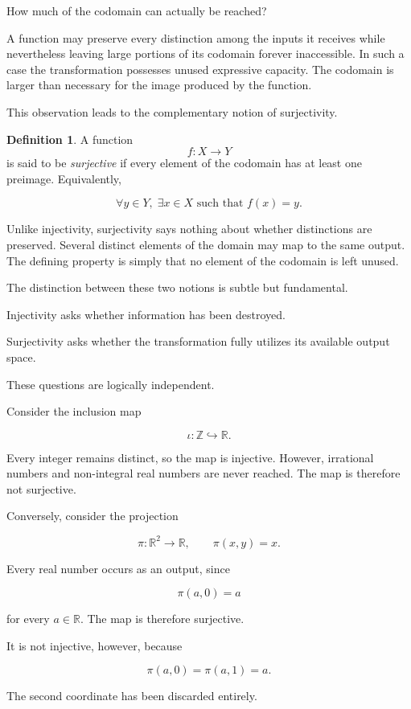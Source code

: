 \documentclass[11pt]{book}
\numberwithin{equation}{chapter}
\theoremstyle{definition}
\newtheorem{definition}{Definition}[chapter]
\theoremstyle{plain}
\theoremstyle{remark}
\begin{document}
How much of the codomain can actually be reached?

A function may preserve every distinction among the inputs it receives while nevertheless leaving large portions of its codomain forever inaccessible. In such a case the transformation possesses unused expressive capacity. The codomain is larger than necessary for the image produced by the function.

This observation leads to the complementary notion of surjectivity.

\begin{definition}
A function
\[
f:X\rightarrow Y
\]
is said to be \emph{surjective} if every element of the codomain has at least one preimage. Equivalently,

\[
\forall y\in Y,\;
\exists x\in X
\text{ such that }
f(x)=y.
\]
\end{definition}

Unlike injectivity, surjectivity says nothing about whether distinctions are preserved. Several distinct elements of the domain may map to the same output. The defining property is simply that no element of the codomain is left unused.

The distinction between these two notions is subtle but fundamental.

Injectivity asks whether information has been destroyed.

Surjectivity asks whether the transformation fully utilizes its available output space.

These questions are logically independent.

Consider the inclusion map

\[
\iota:\mathbb{Z}\hookrightarrow\mathbb{R}.
\]

Every integer remains distinct, so the map is injective. However, irrational numbers and non-integral real numbers are never reached. The map is therefore not surjective.

Conversely, consider the projection

\[
\pi:\mathbb{R}^{2}\rightarrow\mathbb{R},
\qquad
\pi(x,y)=x.
\]

Every real number occurs as an output, since

\[
\pi(a,0)=a
\]

for every \(a\in\mathbb{R}\). The map is therefore surjective.

It is not injective, however, because

\[
\pi(a,0)
=
\pi(a,1)
=
a.
\]

The second coordinate has been discarded entirely.
\end{document}
